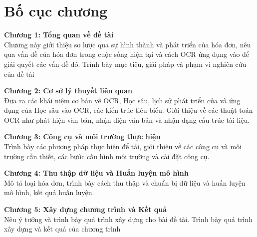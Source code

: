 \section{Bố cục chương}
\textbf{Chương 1: Tổng quan về đề tài} \\Chương này giới thiệu sơ lược qua sự hình thành và phát triển của hóa đơn, nêu qua vấn đề của hóa đơn trong cuộc sống hiện tại và cách OCR ứng dụng vào để giải quyết các vấn đề đó. Trình bày mục tiêu, giải pháp và phạm vi nghiên cứu của đề tài 

\textbf{Chương 2: Cơ sở lý thuyết liên quan} \\Đưa ra các khái niệm cơ bản về OCR, Học sâu, lịch sử phát triển của và ứng dụng của Học sâu vào OCR, các kiến trúc tiêu biểu. Giới thiệu về các thuật toán OCR như phát hiện văn bản, nhận diện văn bản và nhận dạng cấu trúc tài liệu.

\textbf{Chương 3: Công cụ và môi trường thực hiện} \\Trình bày các phương pháp thực hiện để tài, giới thiệu về các công cụ và môi trường cần thiết, các bước cấu hình môi trường và cài đặt công cụ.

\textbf{Chương 4: Thu thập dữ liệu và Huấn luyện mô hình} \\Mô tả loại hóa đơn, trình bày cách thu thập và chuẩn bị dữ liệu và huấn luyện mô hình, kết quả huấn luyện.

\textbf{Chương 5: Xây dựng chương trình và Kết quả} \\Nêu ý tưởng và trình bày quá trình xây dựng cho bài đề tài. Trình bày quá trình xây dựng và kết quả của chương trình

